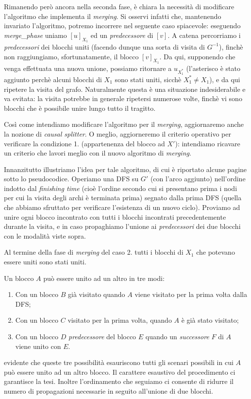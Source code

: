 Rimanendo però ancora nella seconda fase, è chiara la necessità di modificare l'algoritmo che implementa il \emph{merging}. Si osservi infatti che, mantenendo invariato l'algoritmo, potremo incorrere nel seguente caso spiacevole: eseguendo \emph{merge\_phase} uniamo $[u]_{X_1}$ ed un \emph{predecessore} di $[v]$. A catena percorriamo i \emph{predecessori} dei blocchi uniti (facendo dunque una sorta di visita di $G^{-1}$), finchè non raggiungiamo, sfortunatamente, il blocco $[v]_{X_1}$. Da qui, supponendo che venga effettuata una nuova unione, possiamo ritornare a $u_{X_1^*}$ (l'asterisco è stato aggiunto perchè alcuni blocchi di $X_1$ sono stati uniti, sicchè $X_1^* \neq X_1$), e da qui ripetere la visita del grafo. Naturalmente questa è una situazione indesiderabile e va evitata: la visita potrebbe in generale ripetersi numerose volte, finchè vi sono blocchi che è possibile unire lungo tutto il tragitto.

Così come intendiamo modificare l'algoritmo per il \emph{merging}, aggiornaremo anche la nozione di \emph{causal splitter}. O meglio, aggiorneremo il criterio operativo per verificare la condizione 1. (appartenenza del blocco ad $X'$): intendiamo ricavare un criterio che lavori meglio con il nuovo algoritmo di \emph{merging}.

Innanzitutto illustriamo l'idea per tale algoritmo, di cui è riportato alcune pagine sotto lo pseudocodice. Operiamo una DFS su $G'$ (con l'arco aggiunto) nell'ordine indotto dal \emph{finishing time} (cioè l'ordine secondo cui si presentano prima i nodi per cui la visita degli archi è terminata prima) segnato dalla prima DFS (quella che abbiamo sfruttato per verificare l'esistenza di un nuovo ciclo). Proviamo ad unire ogni blocco incontrato con tutti i blocchi incontrati precedentemente durante la visita, e in caso propaghiamo l'unione ai \emph{predecessori} dei due blocchi con le modalità viste sopra.

\begin{observation}
    Al termine della fase di \emph{merging} del caso 2. tutti i blocchi di $X_1$ che potevano essere uniti sono stati uniti.
\end{observation}
\begin{proof2}
    Un blocco $A$ può essere unito ad un altro in tre modi:
    \begin{enumerate}
        \item Con un blocco $B$ già visitato quando $A$ viene visitato per la prima volta dalla DFS;
        \item Con un blocco $C$ visitato per la prima volta, quando $A$ è già stato visitato;
        \item Con un blocco $D$ \emph{predecessore} del blocco $E$ quando un \emph{successore} $F$ di $A$ viene unito con $E$.
    \end{enumerate}
    \accente evidente che queste tre possibilità esauriscono tutti gli scenari possibili in cui $A$ può essere unito ad un altro blocco. Il carattere esaustivo del procedimento ci garantisce la tesi. Inoltre l'ordinamento che seguiamo ci consente di ridurre il numero di propagazioni necessarie in seguito all'unione di due blocchi.
\end{proof2}

